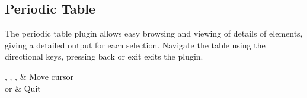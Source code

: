 \subsection{Periodic Table}

The periodic table plugin allows easy browsing and viewing of details of elements, giving a detailed output for each selection. Navigate the table using the directional keys, pressing back or exit exits the plugin.

\begin{btnmap}
  \PluginUp, \PluginDown, \PluginLeft, \PluginRight
  & Move cursor\\

  \PluginCancel{}
  or \PluginSelect
  & Quit\\
\end{btnmap}
